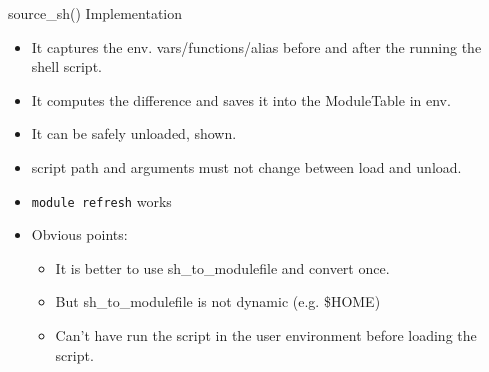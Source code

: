 \documentclass{beamer}
\begin{document}
\begin{frame}{source\_sh() Implementation}
  \begin{itemize}
    \item It captures the env. vars/functions/alias before and after
      the running the shell script.
    \item It computes the difference and saves it into the ModuleTable
      in env.
    \item It can be safely unloaded, shown.
    \item script path and arguments must not change between load and unload.
    \item \texttt{module refresh} works
    \item Obvious points:
      \begin{itemize}
        \item It is better to use sh\_to\_modulefile and convert once.
        \item But sh\_to\_modulefile is not dynamic (e.g. \$HOME)
        \item Can't have run the script in the user environment before
          loading the script.
      \end{itemize}
  \end{itemize}
\end{frame}
\end{document}
